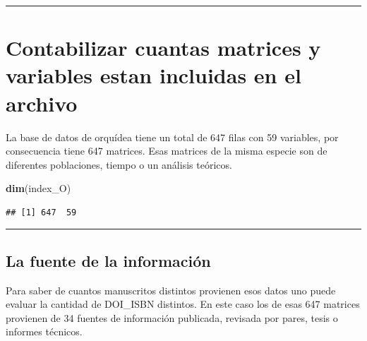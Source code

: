 \documentclass[
]{book}
\newenvironment{Shaded}{\begin{snugshade}}{\end{snugshade}}
\newcommand{\FunctionTok}[1]{\textcolor[rgb]{0.13,0.29,0.53}{\textbf{#1}}}
\newcommand{\NormalTok}[1]{#1}
\newcommand{\SpecialCharTok}[1]{\textcolor[rgb]{0.81,0.36,0.00}{\textbf{#1}}}
\theoremstyle{definition}
\theoremstyle{definition}
\theoremstyle{definition}
\theoremstyle{definition}
\theoremstyle{remark}
\begin{document}
\begin{center}\rule{0.5\linewidth}{0.5pt}\end{center}

\section{Contabilizar cuantas matrices y variables estan incluidas en el archivo}\label{contabilizar-cuantas-matrices-y-variables-estan-incluidas-en-el-archivo}

La base de datos de orquídea tiene un total de 647 filas con 59 variables, por consecuencia tiene 647 matrices. Esas matrices de la misma especie son de diferentes poblaciones, tiempo o un análisis teóricos.

\begin{Shaded}
\begin{Highlighting}[]
\FunctionTok{dim}\NormalTok{(index\_O)}
\end{Highlighting}
\end{Shaded}

\begin{verbatim}
## [1] 647  59
\end{verbatim}

\begin{center}\rule{0.5\linewidth}{0.5pt}\end{center}

\subsection{La fuente de la información}\label{la-fuente-de-la-informaciuxf3n}

Para saber de cuantos manuscritos distintos provienen esos datos uno puede evaluar la cantidad de DOI\_ISBN distintos. En este caso los de esas 647 matrices provienen de 34 fuentes de información publicada, revisada por pares, tesis o informes técnicos.

\begin{Shaded}
\end{Shaded}
\end{document}
